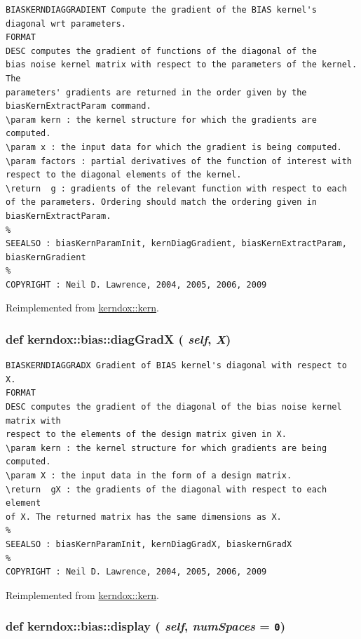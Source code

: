 \footnotesize\begin{verbatim}BIASKERNDIAGGRADIENT Compute the gradient of the BIAS kernel's diagonal wrt parameters.
FORMAT
DESC computes the gradient of functions of the diagonal of the
bias noise kernel matrix with respect to the parameters of the kernel. The
parameters' gradients are returned in the order given by the
biasKernExtractParam command.
\param kern : the kernel structure for which the gradients are
computed.
\param x : the input data for which the gradient is being computed.
\param factors : partial derivatives of the function of interest with
respect to the diagonal elements of the kernel.
\return  g : gradients of the relevant function with respect to each
of the parameters. Ordering should match the ordering given in
biasKernExtractParam.
%
SEEALSO : biasKernParamInit, kernDiagGradient, biasKernExtractParam, biasKernGradient
%
COPYRIGHT : Neil D. Lawrence, 2004, 2005, 2006, 2009

\end{verbatim}
\normalsize
 

Reimplemented from \hyperlink{classkerndox_1_1kern}{kerndox::kern}.\hypertarget{classkerndox_1_1bias_3f9d5af55498317e3fb015d274efabbf}{
\subsubsection[{diagGradX}]{\setlength{\rightskip}{0pt plus 5cm}def kerndox::bias::diagGradX ( {\em self}, \/   {\em X})}}
\label{classkerndox_1_1bias_3f9d5af55498317e3fb015d274efabbf}




\footnotesize\begin{verbatim}BIASKERNDIAGGRADX Gradient of BIAS kernel's diagonal with respect to X.
FORMAT
DESC computes the gradient of the diagonal of the bias noise kernel matrix with
respect to the elements of the design matrix given in X.
\param kern : the kernel structure for which gradients are being computed.
\param X : the input data in the form of a design matrix.
\return  gX : the gradients of the diagonal with respect to each element
of X. The returned matrix has the same dimensions as X.
%
SEEALSO : biasKernParamInit, kernDiagGradX, biaskernGradX
%
COPYRIGHT : Neil D. Lawrence, 2004, 2005, 2006, 2009

\end{verbatim}
\normalsize
 

Reimplemented from \hyperlink{classkerndox_1_1kern}{kerndox::kern}.\hypertarget{classkerndox_1_1bias_93abbcf30b93880cdddc8b3d5e5b6cb6}{
\subsubsection[{display}]{\setlength{\rightskip}{0pt plus 5cm}def kerndox::bias::display ( {\em self}, \/   {\em numSpaces} = {\tt 0})}}
\label{classkerndox_1_1bias_93abbcf30b93880cdddc8b3d5e5b6cb6}




